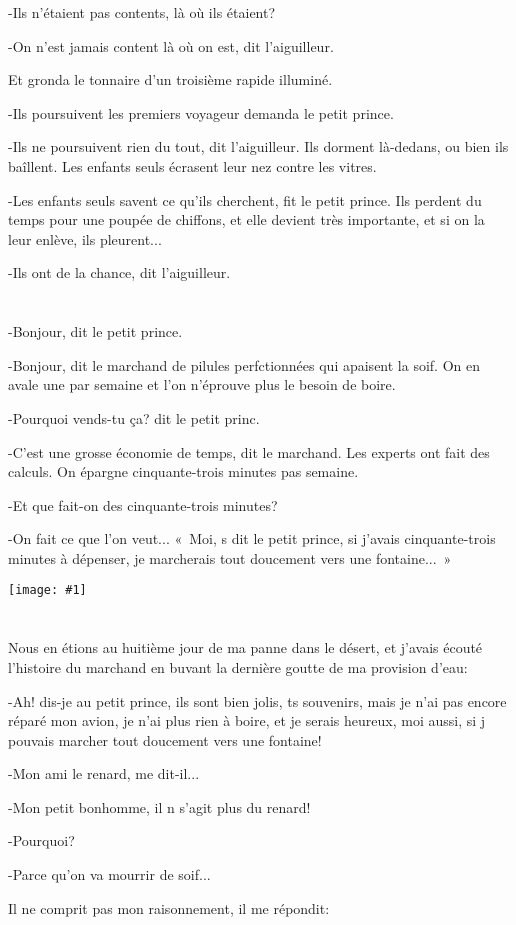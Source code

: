 \documentclass{report}
\newcommand{\parachapter}[2][]{\chapter[#1]{#2}}
\newcommand{\incpic}[1]{%
\begin{center}
    \texttt{[image: \#1]}
\end{center}%
}
\begin{document}
-Ils n'étaient pas contents, là où ils étaient?

-On n'est jamais content là où on est, dit l'aiguilleur.

Et gronda le tonnaire d'un troisième rapide illuminé.

-Ils poursuivent les premiers voyageur demanda le petit prince.

-Ils ne poursuivent rien du tout, dit l'aiguilleur. Ils dorment là-dedans, ou bien ils ba\^illent. Les enfants seuls écrasent leur nez contre les vitres.

-Les enfants seuls savent ce qu'ils cherchent, fit le petit prince. Ils perdent du temps pour une poupée de chiffons, et elle devient très importante, et si on la leur enlève, ils pleurent...

-Ils ont de la chance, dit l'aiguilleur.
\parachapter{} %
-Bonjour, dit le petit prince.

-Bonjour, dit le marchand de pilules perfctionnées qui apaisent la soif. On en avale une par semaine et l'on n'éprouve plus le besoin de boire.

-Pourquoi vends-tu ça? dit le petit princ.

-C'est une grosse économie de temps, dit le marchand. Les experts ont fait des calculs. On épargne cinquante-trois minutes pas semaine.

-Et que fait-on des cinquante-trois minutes?

-On fait ce que l'on veut...
«~Moi, s dit le petit prince, si j'avais cinquante-trois minutes à dépenser, je marcherais tout doucement vers une fontaine...~»

\incpic{pic/image40.png}

\parachapter{} %
Nous en étions au huitième jour de ma panne dans le désert, et j'avais écouté l'histoire du marchand en buvant la dernière goutte de ma provision d'eau:

-Ah! dis-je au petit prince, ils sont bien jolis, ts souvenirs, mais je n'ai pas encore réparé mon avion, je n'ai plus rien à boire, et je serais heureux, moi aussi, si j pouvais marcher tout doucement vers une fontaine!

-Mon ami le renard, me dit-il...

-Mon petit bonhomme, il n s'agit plus du renard!

-Pourquoi?

-Parce qu'on va mourrir de soif...

Il ne comprit pas mon raisonnement, il me répondit:
\end{document}
